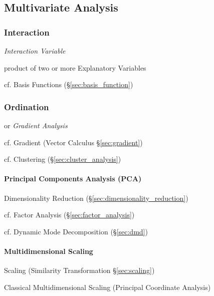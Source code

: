 \subsection{Multivariate Analysis}\label{sec:multivariate_analysis}

\subsubsection{Interaction}\label{sec:interaction}

\emph{Interaction Variable}

product of two or more Explanatory Variables

cf. Basis Functions (\S\ref{sec:basis_function})



\subsubsection{Ordination}\label{sec:ordination}

or \emph{Gradient Analysis}

cf. Gradient (Vector Calculus \S\ref{sec:gradient})

cf. Clustering (\S\ref{sec:cluster_analysis})



\paragraph{Principal Components Analysis (PCA)}\label{sec:pca}\hfill

Dimensionality Reduction (\S\ref{sec:dimensionality_reduction})

cf. Factor Analysis (\S\ref{sec:factor_analysis})

cf. Dynamic Mode Decomposition (\S\ref{sec:dmd})



\paragraph{Multidimensional Scaling}\label{sec:multidimensional_scaling}\hfill

\fist Scaling (Similarity Transformation \S\ref{sec:scaling})

Classical Multidimensional Scaling (Principal Coordinate Analysis)


